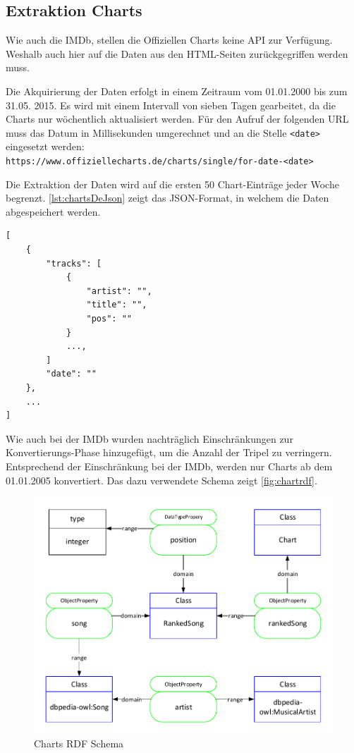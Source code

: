 \documentclass[parskip]{scrartcl}
\begin{document}
\subsection{Extraktion Charts}

Wie auch die IMDb, stellen die Offiziellen Charts keine API zur Verfügung. Weshalb auch hier auf die Daten aus den HTML-Seiten zurückgegriffen werden muss.

Die Akquirierung der Daten erfolgt in einem Zeitraum vom 01.01.2000 bis zum 31.05. 2015. Es wird mit einem Intervall von sieben Tagen gearbeitet, da die Charts nur wöchentlich aktualisiert werden. Für den Aufruf der folgenden URL muss das Datum in Millisekunden umgerechnet und an die Stelle \texttt{<date>} eingesetzt werden:\\
\texttt{https://www.offiziellecharts.de/charts/single/for-date-<date>}

Die Extraktion der Daten wird auf die ersten 50 Chart-Einträge jeder Woche begrenzt. \autoref{lst:chartsDeJson} zeigt das JSON-Format, in welchem die Daten abgespeichert werden.

\begin{lstlisting}[caption={Offizielle Charts JSON-Format}, label={lst:chartsDeJson}]
[  
    {
        "tracks": [
            {
                "artist": "",
                "title": "",
                "pos": ""
            }
            ...,
        ]
        "date": ""
    },
    ...
]
\end{lstlisting}

Wie auch bei der IMDb wurden nachträglich Einschränkungen zur Konvertierungs-Phase hinzugefügt, um die Anzahl der Tripel zu verringern. Entsprechend der Einschränkung bei der IMDb, werden nur Charts ab dem 01.01.2005 konvertiert. Das dazu verwendete Schema zeigt \autoref{fig:chartrdf}.

\begin{figure}[H]
    \centering
    \includegraphics[scale=0.8]{charts}
    \caption{Charts RDF Schema}
    \label{fig:chartrdf}
\end{figure}
\end{document}
